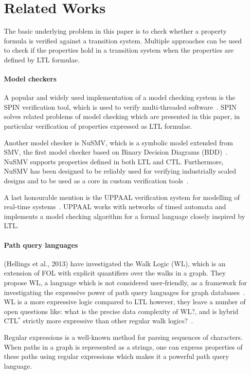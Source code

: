 \section{Related Works}\label{sec:related-works}
The basic underlying problem in this paper is to check whether a property formula is verified against a transition system. Multiple approaches can be used to check if the properties hold in a transition system when the properties are defined by LTL formulae.

\paragraph{Model checkers}
A popular and widely used implementation of a model checking system is the SPIN verification tool, which is used to verify multi-threaded software~\cite{spin}. SPIN solves related problems of model checking which are presented in this paper, in particular verification of properties expressed as LTL formulae.

Another model checker is NuSMV, which is a symbolic model extended from SMV, the first model checker based on Binary Decision Diagrams (BDD)~\cite{nusmv}. NuSMV supports properties defined in both LTL and CTL. Furthermore, NuSMV has been designed to be reliably used for verifying industrially scaled designs and to be used as a core in custom verification tools~\cite{nusmv}.

A last honourable mention is the UPPAAL verification system for modelling of real-time systems~\cite{uppaal}. UPPAAL works with networks of timed automata and implements a model checking algorithm for a formal language closely inspired by LTL.

\paragraph{Path query languages}
(Hellings et al., 2013)\cite{hellings2013walk} have investigated the Walk Logic (WL), which is an extension of FOL with explicit quantifiers over the walks in a graph. They propose WL, a language which is not considered user-friendly, as a framework for investigating the expressive power of path query languages for graph databases~\cite{hellings2013walk}. WL is a more expressive logic compared to LTL however, they leave a number of open questions like: what is the precise data complexity of WL?, and is hybrid CTL$^\ast$ strictly more expressive than other regular walk logics?~\cite{hellings2013walk}.

Regular expressions is a well-known method for parsing sequences of characters. When paths in a graph is represented as a strings, one can express properties of these paths using regular expressions which makes it a powerful path query language. 

